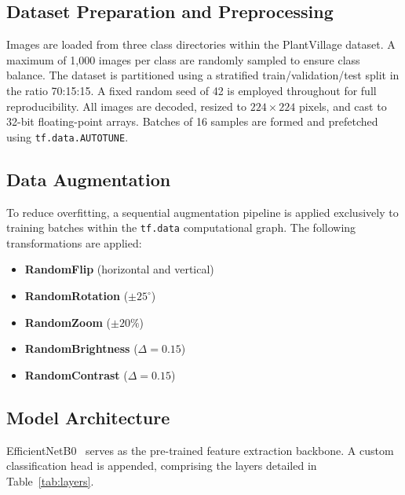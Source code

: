 \documentclass[12pt, a4paper, onecolumn]{IEEEtran}
\begin{document}
\subsection{Dataset Preparation and Preprocessing}

Images are loaded from three class directories within the PlantVillage dataset. A maximum of 1,000
images per class are randomly sampled to ensure class balance. The dataset is partitioned using a
stratified train/validation/test split in the ratio 70:15:15. A fixed random seed of 42 is employed
throughout for full reproducibility. All images are decoded, resized to $224\times224$ pixels, and cast
to 32-bit floating-point arrays. Batches of 16 samples are formed and prefetched using
\texttt{tf.data.AUTOTUNE}.

\subsection{Data Augmentation}

To reduce overfitting, a sequential augmentation pipeline is applied exclusively to training batches
within the \texttt{tf.data} computational graph. The following transformations are applied:

\begin{itemize}[leftmargin=1.6em, noitemsep]
  \item \textbf{RandomFlip} (horizontal and vertical)
  \item \textbf{RandomRotation} ($\pm25^\circ$)
  \item \textbf{RandomZoom} ($\pm20\%$)
  \item \textbf{RandomBrightness} ($\Delta=0.15$)
  \item \textbf{RandomContrast} ($\Delta=0.15$)
\end{itemize}

\subsection{Model Architecture}

EfficientNetB0~\cite{tan2019} serves as the pre-trained feature extraction backbone. A custom
classification head is appended, comprising the layers detailed in Table~\ref{tab:layers}.
\end{document}

